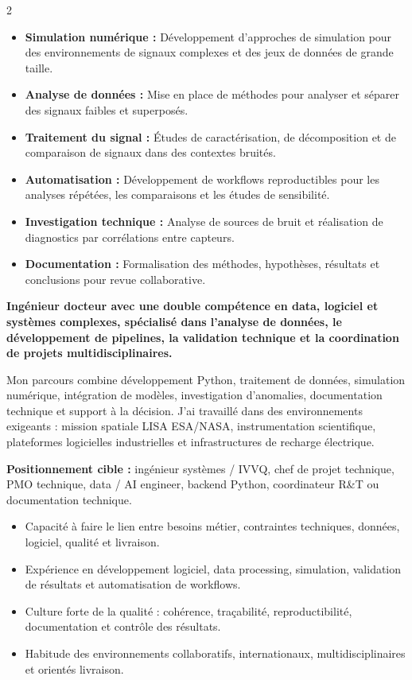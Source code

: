 \documentclass[8pt,a4paper,ragged2e,withhyper]{altacv}
\begin{document}
\begin{paracol}{2}
\begin{itemize}
  \item \textbf{Simulation numérique :} Développement d'approches de simulation pour des environnements de signaux complexes et des jeux de données de grande taille.
  \item \textbf{Analyse de données :} Mise en place de méthodes pour analyser et séparer des signaux faibles et superposés.
  \item \textbf{Traitement du signal :} Études de caractérisation, de décomposition et de comparaison de signaux dans des contextes bruités.
  \item \textbf{Automatisation :} Développement de workflows reproductibles pour les analyses répétées, les comparaisons et les études de sensibilité.
  \item \textbf{Investigation technique :} Analyse de sources de bruit et réalisation de diagnostics par corrélations entre capteurs.
  \item \textbf{Documentation :} Formalisation des méthodes, hypothèses, résultats et conclusions pour revue collaborative.
\end{itemize}

\switchcolumn


\textbf{Ingénieur docteur avec une double compétence en data, logiciel et systèmes complexes, spécialisé dans l'analyse de données, le développement de pipelines, la validation technique et la coordination de projets multidisciplinaires.}

Mon parcours combine développement Python, traitement de données, simulation numérique, intégration de modèles, investigation d'anomalies, documentation technique et support à la décision. J'ai travaillé dans des environnements exigeants : mission spatiale LISA ESA/NASA, instrumentation scientifique, plateformes logicielles industrielles et infrastructures de recharge électrique.

\medskip

\textbf{Positionnement cible :} ingénieur systèmes / IVVQ, chef de projet technique, PMO technique, data / AI engineer, backend Python, coordinateur R\&T ou documentation technique.

\begin{itemize}
  \item Capacité à faire le lien entre besoins métier, contraintes techniques, données, logiciel, qualité et livraison.
  \item Expérience en développement logiciel, data processing, simulation, validation de résultats et automatisation de workflows.
  \item Culture forte de la qualité : cohérence, traçabilité, reproductibilité, documentation et contrôle des résultats.
  \item Habitude des environnements collaboratifs, internationaux, multidisciplinaires et orientés livraison.
\end{itemize}


\end{paracol}
\end{document}
